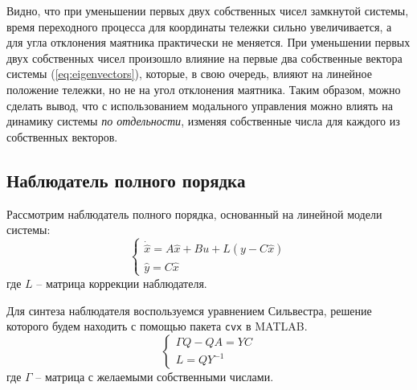 \FloatBarrier
Видно, что при уменьшении первых двух собственных чисел замкнутой системы, время переходного процесса для 
координаты тележки сильно увеличивается, а для угла отклонения маятника практически не меняется.
При уменьшении первых двух собственных чисел произошло влияние на первые 
два собственные вектора системы (\ref{eq:eigenvectors}), которые, в свою очередь, влияют на 
линейное положение тележки, но не на угол отклонения маятника. Таким образом, можно сделать вывод, что 
с использованием модального управления можно влиять на динамику системы \textit{по отдельности}, изменяя 
собственные числа для каждого из собственных векторов.

\subsection{Наблюдатель полного порядка}
Рассмотрим наблюдатель полного порядка, основанный на линейной модели системы: 
\begin{equation}
    \begin{cases}
        \dot{\hat{x}} = A\hat{x} + Bu + L(y - C\hat{x})\\
        \hat{y} = C\hat{x}
    \end{cases}
\end{equation}
где $L$ -- матрица коррекции наблюдателя. 

Для синтеза наблюдателя воспользуемся уравнением Сильвестра, решение которого будем находить с помощью
пакета \texttt{cvx} в MATLAB.
\begin{equation}
    \begin{cases}
        \Gamma Q - QA = YC \\ 
        L = QY^{-1}
    \end{cases}
\end{equation}
где $\Gamma$ -- матрица с желаемыми собственными числами. 

